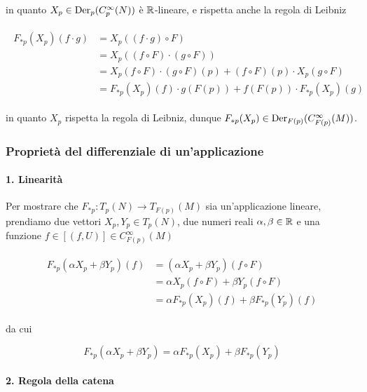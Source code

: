 in quanto $ X_{p} \in \operatorname{Der}_{p}(C_{p}^{\infty}(N)) $ è $ \mathbb{R} $-lineare, e rispetta anche la regola di Leibniz

\begin{align}
	\begin{split}
		F_{*p}(X_{p})(f \cdot g) &= X_{p}((f \cdot g) \circ F)\\
		&= X_{p}((f \circ F) \cdot (g \circ F))\\
		&= X_{p}(f \circ F) \cdot (g \circ F)(p) + (f \circ F)(p) \cdot X_{p}(g \circ F)\\
		&= F_{*p}(X_{p})(f) \cdot g(F(p)) + f(F(p)) \cdot F_{*p}(X_{p})(g)
	\end{split}
\end{align}

in quanto $ X_{p}$ rispetta la regola di Leibniz, dunque $ F_{*p}(X_{p}) \in \operatorname{Der}_{F(p)}(C_{F(p)}^{\infty}(M)) $.

\subsubsection{Proprietà del differenziale di un'applicazione}

\paragraph{1. Linearità}

Per mostrare che $ F_{*p} : T_{p}(N) \to T_{F(p)}(M) $ sia un'applicazione lineare, prendiamo due vettori $ X_{p},Y_{p} \in T_{p}(N) $, due numeri reali $ \alpha,\beta \in \mathbb{R} $ e una funzione $ f \in [(f,U)] \in C_{F(p)}^{\infty}(M) $

\begin{align}
	\begin{split}
		F_{*p}(\alpha X_{p} + \beta Y_{p})(f) &= (\alpha X_{p} + \beta Y_{p})(f \circ F)\\
		&= \alpha X_{p}(f \circ F) + \beta Y_{p}(f \circ F)\\
		&= \alpha F_{*p}(X_{p})(f) + \beta F_{*p}(Y_{p})(f)
	\end{split}
\end{align}

da cui

\begin{equation}
	F_{*p}(\alpha X_{p} + \beta Y_{p}) = \alpha F_{*p}(X_{p}) + \beta F_{*p}(Y_{p})
\end{equation}

\paragraph{2. Regola della catena}

